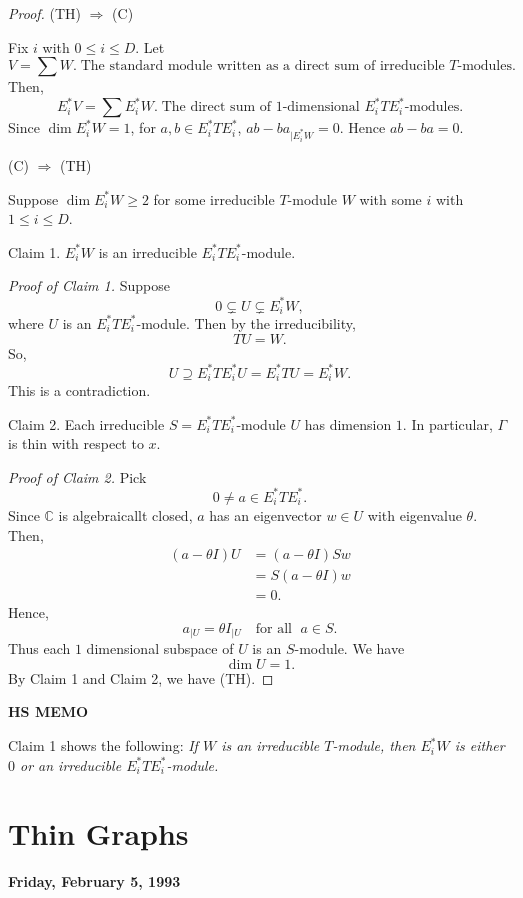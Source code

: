 \documentclass[
]{book}
\theoremstyle{definition}
\theoremstyle{definition}
\theoremstyle{definition}
\theoremstyle{definition}
\theoremstyle{remark}
\begin{document}
\begin{proof}
\leavevmode

(TH) \(\Rightarrow\) (C)

Fix \(i\) with \(0\leq i\leq D\). Let
\[V = \sum W. \; \text{The standard module written as a direct sum of irreducible $T$-modules}.\]
Then,
\[E_i^*V = \sum E_i^*W. \; \text{The direct sum of 1-dimensional $E_i^*TE_i^*$-modules}.\]
Since \(\dim E_i^*W = 1\), for \(a, b\in E_i^*TE_i^*\), \({ab - ba}_{| E_i^*W} = 0\). Hence \(ab - ba = 0\).

(C) \(\Rightarrow\) (TH)

Suppose \(\dim E_i^*W \geq 2\) for some irreducible \(T\)-module \(W\) with some \(i\) with \(1\leq i\leq D\).

Claim 1. \(E_i^*W\) is an irreducible \(E_i^*TE_i^*\)-module.

\emph{Proof of Claim 1.}
Suppose
\[0 \subsetneq U \subsetneq E_i^*W,\]
where \(U\) is an \(E_i^*TE_i^*\)-module. Then by the irreducibility,
\[TU = W.\]
So,
\[U \supseteq E_i^*TE_i^*U = E_i^*TU = E^*_iW.\]
This is a contradiction.

Claim 2. Each irreducible \(S = E_i^*TE_i^*\)-module \(U\) has dimension \(1\). In particular, \(\Gamma\) is thin with respect to \(x\).

\emph{Proof of Claim 2.}
Pick
\[0\neq a \in E_i^*TE_i^*.\]
Since \(\mathbb{C}\) is algebraicallt closed, \(a\) has an eigenvector \(w\in U\) with eigenvalue \(\theta\). Then,
\begin{align}
(a- \theta I)U & = (a-\theta I)Sw\\
& = S(a-\theta I)w\\
& = 0.
\end{align}
Hence,
\[a_{|U} = \theta I_{|U} \quad \text{for all }\; a\in S.\]
Thus each \(1\) dimensional subspace of \(U\) is an \(S\)-module. We have
\[\dim U = 1.\]
By Claim 1 and Claim 2, we have (TH).

\end{proof}

\textbf{HS MEMO}

Claim 1 shows the following: \emph{If \(W\) is an irreducible \(T\)-module, then \(E^*_iW\) is either \(0\) or an irreducible \(E^*_iTE^*_i\)-module.}

\hypertarget{lec8}{%
\chapter{Thin Graphs}\label{lec8}}

\textbf{Friday, February 5, 1993}
\end{document}
